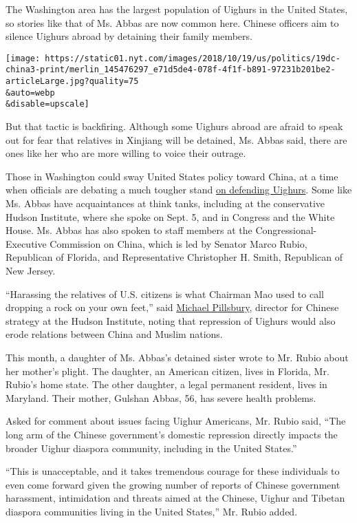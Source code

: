 The Washington area has the largest population of Uighurs in the United
States, so stories like that of Ms. Abbas are now common here. Chinese
officers aim to silence Uighurs abroad by detaining their family
members.

\texttt{[image: https://static01.nyt.com/images/2018/10/19/us/politics/19dc-china3-print/merlin\_145476297\_e71d5de4-078f-4f1f-b891-97231b201be2-articleLarge.jpg?quality=75\\\&auto=webp\\\&disable=upscale]}

But that tactic is backfiring. Although some Uighurs abroad are afraid
to speak out for fear that relatives in Xinjiang will be detained, Ms.
Abbas said, there are ones like her who are more willing to voice their
outrage.

Those in Washington could sway United States policy toward China, at a
time when officials are debating a much tougher stand
\href{http://www.chinafile.com/conversation/how-should-world-respond-intensifying-repression-xinjiang}{on
defending Uighurs}. Some like Ms. Abbas have acquaintances at think
tanks, including at the conservative Hudson Institute, where she spoke
on Sept. 5, and in Congress and the White House. Ms. Abbas has also
spoken to staff members at the Congressional-Executive Commission on
China, which is led by Senator Marco Rubio, Republican of Florida, and
Representative Christopher H. Smith, Republican of New Jersey.

``Harassing the relatives of U.S. citizens is what Chairman Mao used to
call dropping a rock on your own feet,'' said
\href{https://www.hudson.org/experts/724-michael-pillsbury}{Michael
Pillsbury}, director for Chinese strategy at the Hudson Institute,
noting that repression of Uighurs would also erode relations between
China and Muslim nations.

This month, a daughter of Ms. Abbas's detained sister wrote to Mr. Rubio
about her mother's plight. The daughter, an American citizen, lives in
Florida, Mr. Rubio's home state. The other daughter, a legal permanent
resident, lives in Maryland. Their mother, Gulshan Abbas, 56, has severe
health problems.

Asked for comment about issues facing Uighur Americans, Mr. Rubio said,
``The long arm of the Chinese government's domestic repression directly
impacts the broader Uighur diaspora community, including in the United
States.''

``This is unacceptable, and it takes tremendous courage for these
individuals to even come forward given the growing number of reports of
Chinese government harassment, intimidation and threats aimed at the
Chinese, Uighur and Tibetan diaspora communities living in the United
States,'' Mr. Rubio added.

